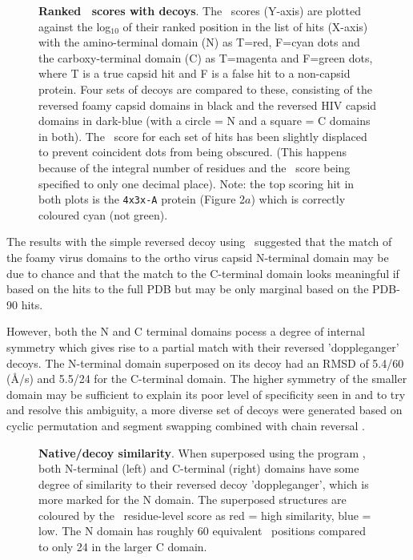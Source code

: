\begin{figure}
\centering
{}
\begin{footnotesize}
\caption{
\label{Fig:revs}
{\bf Ranked \DALI\ scores with decoys}.
The \DALI\ scores (Y-axis) are plotted against the log$_{10}$ of their ranked position in the 
list of hits (X-axis) with the amino-terminal domain (N) as T=red, F=cyan dots and the carboxy-terminal domain (C)
as T=magenta and F=green dots, where T is a true capsid hit and F is a false hit to a non-capsid protein.
Four sets of decoys are compared to these, consisting of the reversed foamy capsid domains in
black and the reversed HIV capsid domains in dark-blue (with a circle = N and a square = C domains in both).
The \DALI\ score for each set of hits has been slightly displaced to prevent coincident dots from being
obscured.  (This happens because of the integral number of residues and the \DALI\ score being specified
to only one decimal place).
Note: the top scoring hit in both plots is the {\tt 4x3x-A} protein (Figure 2$a$) which is correctly coloured cyan (not green).
}
\end{footnotesize}
\end{figure}

The results with the simple reversed decoy using \DALI\, suggested that the match of the foamy virus domains to the
ortho virus capsid N-terminal domain may be due to chance and that the match to the C-terminal domain looks 
meaningful if based on the hits to the full PDB but may be only marginal based on the PDB-90 hits. 

However, both the N and C terminal domains pocess a degree of internal symmetry which gives
rise to a partial match with their reversed 'doppleganger' decoys.   The N-terminal domain superposed on its decoy
had an RMSD of 5.4/60 (\AA/\CA s) and 5.5/24 for the C-terminal domain.   The higher symmetry of the smaller
domain may be sufficient to explain its poor level of specificity seen in  and to try and resolve this
ambiguity, a more diverse set of decoys were generated based on cyclic permutation and segment swapping combined
with chain reversal \cite{TaylorWT97e}.

\begin{figure}
\centering
{}
\begin{footnotesize}
\caption{
\label{Fig:tows}
{\bf Native/decoy similarity}.
When superposed using the program \SAP, both N-terminal (left) and C-terminal (right) domains
have some degree of similarity to their reversed decoy 'doppleganger', which is more marked
for the N domain.   The superposed structures are coloured by the \SAP\ residue-level score as
red = high similarity, blue = low.  The N domain has roughly 60 equivalent \CA\ positions
compared to only 24 in the larger C domain.
}
\end{footnotesize}
\end{figure}

